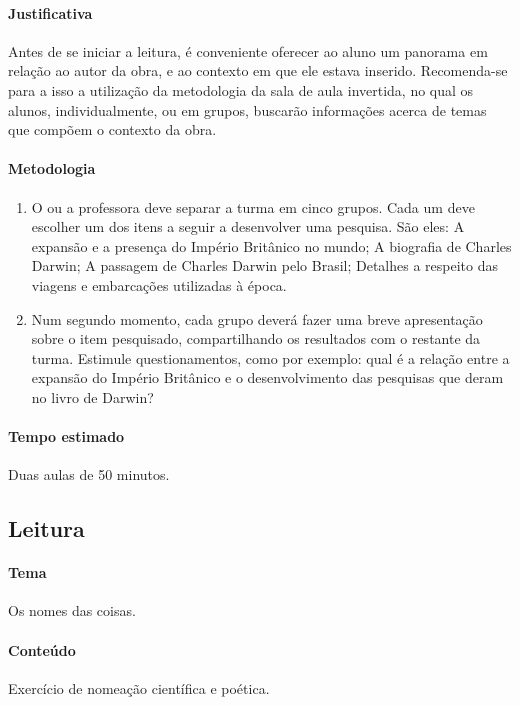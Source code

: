 \documentclass[12pt]{extarticle}
\begin{document}
\paragraph{Justificativa} Antes de se iniciar a leitura, é conveniente oferecer ao 
aluno um panorama em
relação ao autor da obra, e ao contexto em que ele estava inserido.
Recomenda-se para a isso a utilização da metodologia da sala de aula invertida,
no qual os alunos, individualmente, ou em grupos, buscarão informações acerca
de temas que compõem o contexto da obra.

\paragraph{Metodologia}

\begin{enumerate}

	\item
	O ou a professora deve separar a turma em cinco grupos. Cada um deve escolher
	um dos itens a seguir a desenvolver uma pesquisa. São eles: 
	A expansão e a presença do Império Britânico no mundo; A biografia
	de Charles Darwin; A passagem de Charles Darwin pelo Brasil;
	Detalhes a respeito das viagens e embarcações utilizadas à época.
	
	\item
	Num segundo momento, cada grupo deverá fazer uma breve apresentação sobre 
	o item pesquisado, compartilhando os resultados com o restante da turma.
	Estimule questionamentos, como por exemplo: qual é a relação entre
	a expansão do Império Britânico e o desenvolvimento das pesquisas
	que deram no livro de Darwin? 

\end{enumerate}

\paragraph{Tempo estimado} Duas aulas de 50 minutos.


\subsection{Leitura}

\paragraph{Tema} Os nomes das coisas.

\paragraph{Conteúdo} Exercício de nomeação científica e poética.
\end{document}
